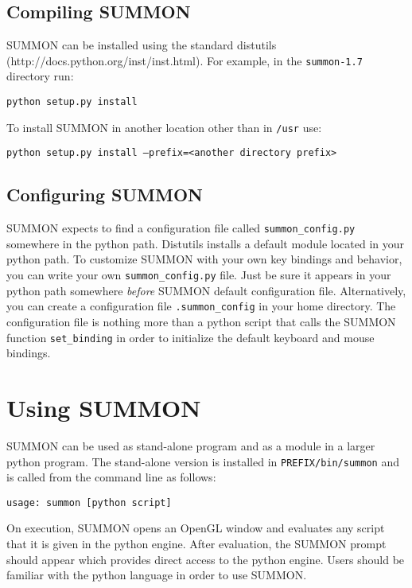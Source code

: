 \documentclass[12pt]{article}
\newcommand{\code}[1]{{\tt #1}}
\newcommand{\codeblock}[1]{\vspace{.1in} {\tt #1} \vspace{.1in}}
\newcommand{\version}{1.7}
\begin{document}
\subsection{Compiling SUMMON}

SUMMON can be installed using the standard distutils 
(http://docs.python.org/inst/inst.html).  For example, in the
\code{summon-\version} directory run:

\codeblock{python setup.py install}

To install SUMMON in another location other than in \code{/usr} use:

\codeblock{python setup.py install --prefix=<another directory prefix>}


\subsection{Configuring SUMMON}

SUMMON expects to find a configuration file called  \code{summon\_config.py}
somewhere in the python path.  Distutils installs a default module located in
your python path.  To customize SUMMON with your own key bindings and behavior,
you can write your own \code{summon\_config.py} file.  Just be sure it appears
in your python path somewhere {\em before} SUMMON default configuration file. 
Alternatively, you can create a configuration file \code{.summon\_config} in
your home directory.  The configuration file is nothing more than a python
script that calls the SUMMON function  \code{set\_binding} in order to
initialize the default keyboard and mouse  bindings.



\section{Using SUMMON}
\label{sec:using}

SUMMON can be used as stand-alone program and as a module in a larger python
program.  The stand-alone version is installed in \code{PREFIX/bin/summon} and
is called from the command line as follows:

\codeblock{usage: summon [python script]}

On execution, SUMMON opens an OpenGL window and evaluates any script that it is
given in the python engine. After evaluation, the SUMMON prompt should appear
which provides direct access to the python engine.  Users should be familiar
with the python language in order to use SUMMON.
\end{document}
